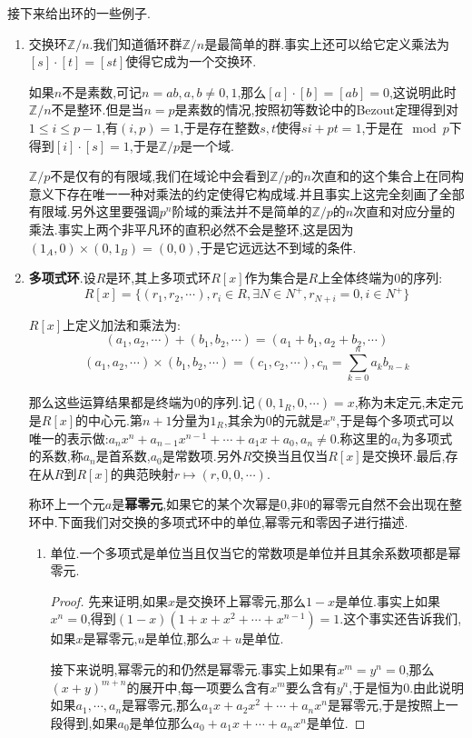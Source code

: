 接下来给出环的一些例子.
\begin{enumerate}
	\item
	交换环$\mathbb{Z}/n$.我们知道循环群$\mathbb{Z}/n$是最简单的群.事实上还可以给它定义乘法为$[s]\cdot[t]=[st]$使得它成为一个交换环.
	
	如果$n$不是素数,可记$n=ab,a,b\not=0,1$,那么$[a]\cdot[b]=[ab]=0$,这说明此时$\mathbb{Z}/n$不是整环.但是当$n=p$是素数的情况,按照初等数论中的Bezout定理得到对$1\le i\le p-1$,有$(i,p)=1$,于是存在整数$s,t$使得$si+pt=1$,于是在$\mod p$下得到$[i]\cdot[s]=1$,于是$\mathbb{Z}/p$是一个域.
	
	$\mathbb{Z}/p$不是仅有的有限域,我们在域论中会看到$\mathbb{Z}/p$的$n$次直和的这个集合上在同构意义下存在唯一一种对乘法的约定使得它构成域.并且事实上这完全刻画了全部有限域.另外这里要强调$p^n$阶域的乘法并不是简单的$\mathbb{Z}/p$的$n$次直和对应分量的乘法.事实上两个非平凡环的直积必然不会是整环,这是因为$(1_A,0)\times(0,1_B)=(0,0)$,于是它远远达不到域的条件.
	\item \textbf{多项式环}.设$R$是环,其上多项式环$R[x]$作为集合是$R$上全体终端为0的序列:
	$$R[x]=\{(r_1,r_2,\cdots),r_i\in R,\exists N\in N^+,r_{N+i}=0,i\in N^+\}$$
	
	$R[x]$上定义加法和乘法为:
	$$(a_1,a_2,\cdots)+(b_1,b_2,\cdots)=(a_1+b_1,a_2+b_2,\cdots)$$
	$$(a_1,a_2,\cdots)\times(b_1,b_2,\cdots)=(c_1,c_2,\cdots),c_n=\sum_{k=0}^n a_kb_{n-k}$$
	
	那么这些运算结果都是终端为0的序列.记$(0,1_R,0,\cdots)=x$,称为未定元,未定元是$R[x]$的中心元.第$n+1$分量为$1_R$,其余为0的元就是$x^n$,于是每个多项式可以唯一的表示做:$a_nx^n+a_{n-1}x^{n-1}+\cdots+a_1x+a_0,a_n\not=0$.称这里的$a_i$为多项式的系数,称$a_n$是首系数,$a_0$是常数项.另外$R$交换当且仅当$R[x]$是交换环.最后,存在从$R$到$R[x]$的典范映射$r\mapsto(r,0,0,\cdots)$.
	
	称环上一个元$a$是\textbf{幂零元},如果它的某个次幂是0,非0的幂零元自然不会出现在整环中.下面我们对交换的多项式环中的单位,幂零元和零因子进行描述.
	\begin{enumerate}
		\item 单位.一个多项式是单位当且仅当它的常数项是单位并且其余系数项都是幂零元.
		\begin{proof}
			先来证明,如果$x$是交换环上幂零元,那么$1-x$是单位.事实上如果$x^n=0$,得到$(1-x)(1+x+x^2+\cdots+x^{n-1})=1$.这个事实还告诉我们,如果$x$是幂零元,$u$是单位,那么$x+u$是单位.
			
			接下来说明,幂零元的和仍然是幂零元.事实上如果有$x^m=y^n=0$,那么$(x+y)^{m+n}$的展开中,每一项要么含有$x^m$要么含有$y^n$,于是恒为0.由此说明如果$a_1,\cdots,a_n$是幂零元,那么$a_1x+a_2x^2+\cdots+a_nx^n$是幂零元,于是按照上一段得到,如果$a_0$是单位那么$a_0+a_1x+\cdots+a_nx^n$是单位.
			

\end{proof}
\end{enumerate}
\end{enumerate}
